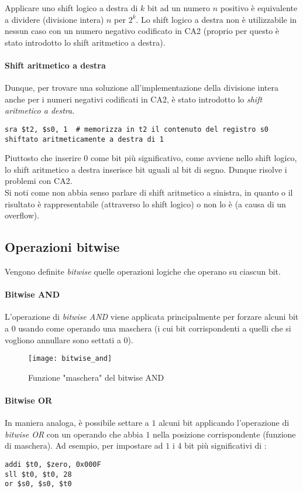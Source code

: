 Applicare uno shift logico a destra di \(k\) bit ad un numero \(n\) positivo è equivalente a dividere (divisione intera) \(n\) per \(2^k\). Lo shift logico a destra non è utilizzabile in nessun caso con un numero negativo codificato in CA2 (proprio per questo è stato introdotto lo shift aritmetico a destra).

\paragraph{Shift aritmetico a destra}
Dunque, per trovare una soluzione all'implementazione della divisione intera anche per i numeri negativi codificati in CA2, è stato introdotto lo \emph{shift aritmetico a destra}.

\begin{verbatim}
sra $t2, $s0, 1  # memorizza in t2 il contenuto del registro s0 shiftato aritmeticamente a destra di 1
\end{verbatim}

Piuttosto che inserire 0 come bit più significativo, come avviene nello shift logico, lo shift aritmetico a destra inserisce bit uguali al bit di segno. Dunque risolve i problemi con CA2.\\
Si noti come non abbia senso parlare di shift aritmetico a sinistra, in quanto o il risultato è rappresentabile (attraverso lo shift logico) o non lo è (a causa di un overflow).

\subsection{Operazioni bitwise}
Vengono definite \emph{bitwise} quelle operazioni logiche che operano su ciascun bit.

\paragraph{Bitwise AND}
L'operazione di \emph{bitwise AND} viene applicata principalmente per forzare alcuni bit a 0 usando come operando una maschera (i cui bit corrispondenti a quelli che si vogliono annullare sono settati a 0).
\begin{figure}[H]
	\centering
	\texttt{[image: bitwise\_and]}
	\caption{Funzione "maschera" del bitwise AND}
\end{figure}

\paragraph{Bitwise OR}
In maniera analoga, è possibile settare a \(1\) alcuni bit applicando l'operazione di \emph{bitwise OR} con un operando che abbia \(1\) nella posizione corrispondente (funzione di maschera). Ad esempio, per impostare ad \(1\) i \(4\) bit più significativi di :
\begin{verbatim}
addi $t0, $zero, 0x000F
sll $t0, $t0, 28
or $s0, $s0, $t0
\end{verbatim}

